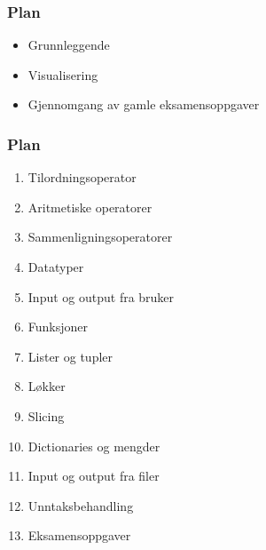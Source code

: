 \documentclass[aspectratio=169]{beamer}
\begin{document}
\begin{frame}
    \frametitle{Plan}

    \begin{itemize}
        \item Grunnleggende
        \item Visualisering
        \item Gjennomgang av gamle eksamensoppgaver 
    \end{itemize}

\end{frame}

\begin{frame}
    \frametitle{Plan}

    \begin{enumerate}
        \item Tilordningsoperator
        \item Aritmetiske operatorer
        \item Sammenligningsoperatorer
        \item Datatyper
        \item Input og output fra bruker
        \item Funksjoner 
        \item Lister og tupler
        \item Løkker 
        \item Slicing 
        \item Dictionaries og mengder 
        \item Input og output fra filer 
        \item Unntaksbehandling
        \item Eksamensoppgaver
    \end{enumerate}

\end{frame}













\end{document}
